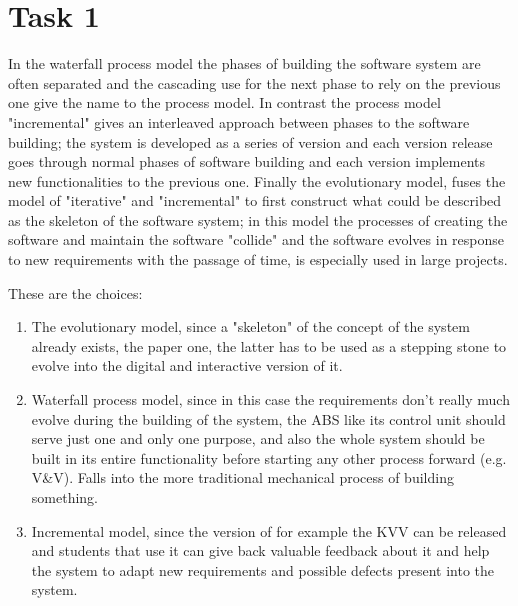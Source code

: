 \chapter{Task 1}
\begin{parlist}
	\item In the waterfall process model the phases of building the software system are often separated and the cascading use for the next phase to rely on the previous one give the name to the process model. In contrast the process model "incremental" gives an interleaved approach between phases to the software building; the system is developed as a series of version and each version release goes through normal phases of software building and each version implements new functionalities to the previous one. Finally the evolutionary model, fuses the model of "iterative" and "incremental" to first construct what could be described as the skeleton of the software system; in this model the processes of creating the software and maintain the software "collide" and the software evolves in response to new requirements with the passage of time, is especially used in large projects. \cite{Sommerville2004aa}\cite{unstopEvolutionaryModel}
	\item These are the choices:
		\begin{enumerate}
			\item The evolutionary model, since a "skeleton" of the concept of the system already exists, the paper one, the latter has to be used as a stepping stone to evolve into the digital and interactive version of it.
			\item Waterfall process model, since in this case the requirements don't really much evolve during the building of the system, the ABS like its control unit should serve just one and only one purpose, and also the whole system should be built in its entire functionality before starting any other process forward (e.g. V\&V). Falls into the more traditional mechanical process of building something.
			\item Incremental model, since the version of for example the KVV can be released and students that use it can give back valuable feedback about it and help the system to adapt new requirements and possible defects present into the system.\cite{Sommerville2004aa}
		\end{enumerate}
\end{parlist}